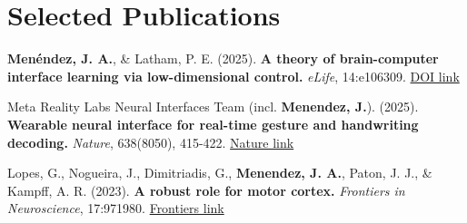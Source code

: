 
\section{Selected Publications}
\begin{itemize}[leftmargin=0.15in, label={}]
  \small{
    \item{
      \textbf{Men\'{e}ndez, J. A.}, \& Latham, P. E. (2025). \textbf{A theory of brain-computer interface learning via low-dimensional control.} \textit{eLife}, 14:e106309. \href{https://doi.org/10.7554/eLife.106309}{DOI link} \\ \vspace{4pt}
      
      Meta Reality Labs Neural Interfaces Team (incl. \textbf{Menendez, J.}). (2025). \textbf{Wearable neural interface for real-time gesture and handwriting decoding.} \textit{Nature}, 638(8050), 415-422. \href{https://nature.com/articles/s41586-025-09255-w}{Nature link} \\ \vspace{4pt}
      
      Lopes, G., Nogueira, J., Dimitriadis, G., \textbf{Menendez, J. A.}, Paton, J. J., \& Kampff, A. R. (2023). \textbf{A robust role for motor cortex.} \textit{Frontiers in Neuroscience}, 17:971980. \href{https://doi.org/10.3389/fnins.2023.971980}{Frontiers link}
    }
  }
\end{itemize}